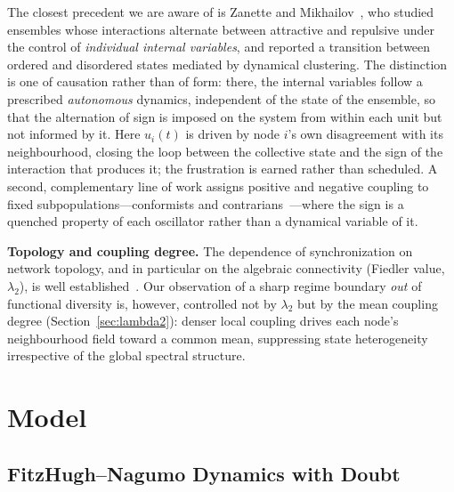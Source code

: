 ﻿\documentclass[11pt]{article}
\begin{document}
The closest precedent we are aware of is Zanette and Mikhailov~\cite{zanette2004}, who studied ensembles whose interactions alternate between attractive and repulsive under the control of \emph{individual internal variables}, and reported a transition between ordered and disordered states mediated by dynamical clustering. The distinction is one of causation rather than of form: there, the internal variables follow a prescribed \emph{autonomous} dynamics, independent of the state of the ensemble, so that the alternation of sign is imposed on the system from within each unit but not informed by it. Here $u_i(t)$ is driven by node $i$'s own disagreement with its neighbourhood, closing the loop between the collective state and the sign of the interaction that produces it; the frustration is earned rather than scheduled. A second, complementary line of work assigns positive and negative coupling to fixed subpopulations---conformists and contrarians~\cite{hong2011}---where the sign is a quenched property of each oscillator rather than a dynamical variable of it.

\textbf{Topology and coupling degree.} The dependence of synchronization on network topology, and in particular on the algebraic connectivity (Fiedler value, $\lambda_2$), is well established~\cite{pikovsky2001}. Our observation of a sharp regime boundary \emph{out} of functional diversity is, however, controlled not by $\lambda_2$ but by the mean coupling degree (Section~\ref{sec:lambda2}): denser local coupling drives each node's neighbourhood field toward a common mean, suppressing state heterogeneity irrespective of the global spectral structure.
\section{Model}
\label{sec:model}

\subsection{FitzHugh--Nagumo Dynamics with Doubt}
\end{document}
